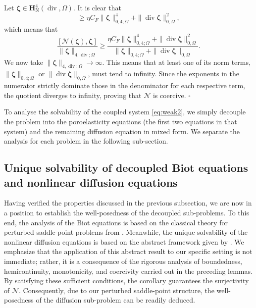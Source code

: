 \documentclass[fleqn,a4paper]{cas-sc}
\newcommand\vdiv{\mathop{\mathrm{div}}\nolimits}
\newcommand{\bzeta}{\boldsymbol{\zeta}}
\newcommand{\0}{\boldsymbol{0}}
\newcommand\cN{\mathcal{N}}
\newcommand\bH{\mathbf{H}}
\numberwithin{equation}{section}
\numberwithin{figure}{section}
\newenvironment{proof}{\noindent{\it Proof.}}{\hfill$\square$}
\begin{document}
\begin{proof}
    Let $\bzeta \in \bH^4_{\mathrm{N}}(\vdiv,\Omega)$. It is clear that
    \begin{equation*}
        [\cN(\bzeta), \bzeta] \ge \eta C_F \|\bzeta\|_{0,4;\Omega}^4 + \|\vdiv \bzeta\|_{0,\Omega}^2,
    \end{equation*}
    which means that
    \begin{equation*}
        \frac{[\cN(\bzeta), \bzeta]}{\|\bzeta\|_{{4,\vdiv;\Omega}}} \ge \frac{\eta C_F \|\bzeta\|_{0,4;\Omega}^4 + \|\vdiv \bzeta\|_{0,\Omega}^2}{\|\bzeta\|_{0,4;\Omega} + \|\vdiv \bzeta\|_{0,\Omega}}.
    \end{equation*}
    We now take $\|\bzeta\|_{{4,\vdiv;\Omega}} \to \infty$. This means that at least one of its norm terms, $\|\bzeta\|_{0,4;\Omega}$ or $\|\vdiv \bzeta\|_{0,\Omega}$, must tend to infinity. Since the exponents in the numerator strictly dominate those in the denominator for each respective term, the quotient diverges to infinity, proving that $\cN$ is coercive.
\end{proof}

To analyse the solvability of the coupled system \eqref{eq:weak2}, we simply decouple the problem into the poroelasticity equations (the first two equations in that system) and the remaining diffusion equation in mixed form. We separate the analysis for each problem in the following sub-section. 
\subsection{Unique solvability of decoupled Biot equations and nonlinear diffusion equations}\label{sec:wp-decoupled}

Having verified the properties discussed in the previous subsection, we are now in a position to establish the well-posedness of the decoupled sub-problems. To this end, the analysis of the Biot equations is based on the classical theory for perturbed saddle-point problems from \cite[Theorem 4.3.1]{boffi13}. Meanwhile, the unique solvability of the nonlinear diffusion equations is based on the abstract framework given by \cite[Corollary 2.2]{showalter1997}. We emphasize that the application of this abstract result to our specific setting is not immediate; rather, it is a consequence of the rigorous analysis of boundedness, hemicontinuity, monotonicity, and coercivity carried out in the preceding lemmas. By satisfying these sufficient conditions, the corollary guarantees the surjectivity of $\cN$. Consequently, due to our perturbed saddle-point structure, the well-posedness of the diffusion sub-problem can be readily deduced.
\end{document}
